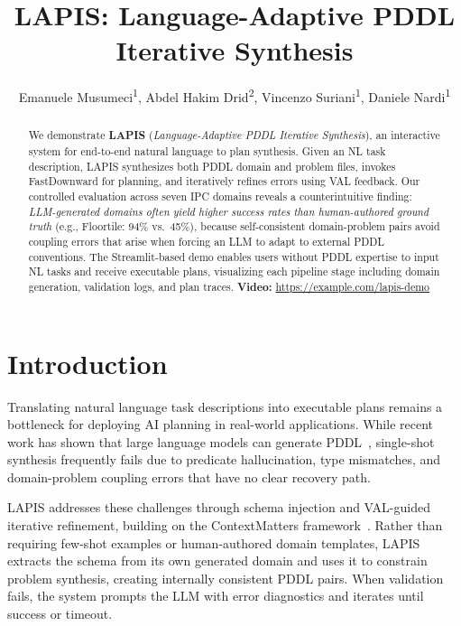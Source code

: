 \documentclass[letterpaper]{article}
\title{LAPIS: Language-Adaptive PDDL Iterative Synthesis}
\author{
    Emanuele Musumeci\textsuperscript{\rm 1},
    Abdel Hakim Drid\textsuperscript{\rm 2},
    Vincenzo Suriani\textsuperscript{\rm 1},
    Daniele Nardi\textsuperscript{\rm 1}
}
\begin{document}
\maketitle

\begin{abstract}
We demonstrate \textbf{LAPIS} (\emph{Language-Adaptive PDDL Iterative Synthesis}), an interactive system for end-to-end natural language to plan synthesis. Given an NL task description, LAPIS synthesizes both PDDL domain and problem files, invokes FastDownward for planning, and iteratively refines errors using VAL feedback. Our controlled evaluation across seven IPC domains reveals a counterintuitive finding: \emph{LLM-generated domains often yield higher success rates than human-authored ground truth} (e.g., Floortile: 94\% vs.\ 45\%), because self-consistent domain-problem pairs avoid coupling errors that arise when forcing an LLM to adapt to external PDDL conventions. The Streamlit-based demo enables users without PDDL expertise to input NL tasks and receive executable plans, visualizing each pipeline stage including domain generation, validation logs, and plan traces.
\textbf{Video:} \url{https://example.com/lapis-demo}
\end{abstract}

\section{Introduction}

Translating natural language task descriptions into executable plans remains a bottleneck for deploying AI planning in real-world applications. While recent work has shown that large language models can generate PDDL~\citep{llmpp2023, nl2plan2025}, single-shot synthesis frequently fails due to predicate hallucination, type mismatches, and domain-problem coupling errors that have no clear recovery path.

LAPIS addresses these challenges through schema injection and VAL-guided iterative refinement, building on the ContextMatters framework~\citep{contextmatters2025}. Rather than requiring few-shot examples or human-authored domain templates, LAPIS extracts the schema from its own generated domain and uses it to constrain problem synthesis, creating internally consistent PDDL pairs. When validation fails, the system prompts the LLM with error diagnostics and iterates until success or timeout.
\end{document}
